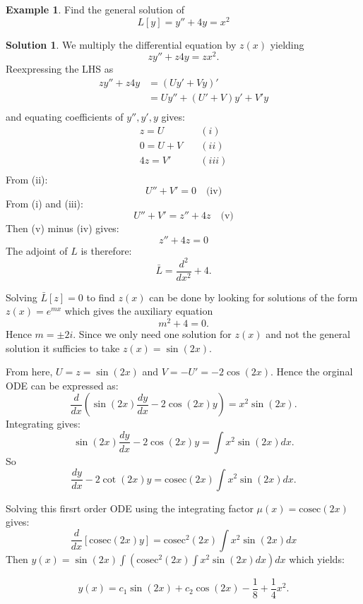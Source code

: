 \documentclass{article}
\theoremstyle{plain}
\theoremstyle{definition}
\newtheorem{exmp}{Example}[section]
\newtheorem*{sol}{Solution}
\numberwithin{equation}{section}
\begin{document}
\begin{tcolorbox}
    \begin{exmp}
        Find the general solution of
        \[ L[y]= y'' + 4y = x^2 \]
    \end{exmp}
    \begin{sol}
        We multiply the differential equation by $z(x)$ yielding
        \[ zy'' + z4y = zx^2. \]
        Reexpressing the LHS as
        \begin{align*}
            zy'' + z4y &= (Uy' + Vy)' \\
            &= Uy'' + (U'+V)y' + V'y \\
        \end{align*}
        and equating coefficients of $y'',y',y$ gives:
        \[ \begin{matrix}
            z=U & \quad (i) \\
            0 = U + V & \quad (ii) \\
            4z = V' & \quad (iii) \\
        \end{matrix}
        \]
        From (ii): 
        \[U''+V'=0 \quad \text{(iv)} \]
        From (i) and (iii):
        \[ U''+V' = z'' + 4z \quad \text{(v)} \]
        Then (v) minus (iv) gives:
        \[ z'' + 4z = 0 \]
        The adjoint of $L$ is therefore:
        \[ \bar{L} = \frac{d^2}{dx^2} + 4. \]

        Solving $\bar{L}[z] = 0$ to find $z(x)$ can be done by looking for solutions of the form $z(x) = e^{mx}$ which gives the auxiliary equation
        \[ m^2 + 4 = 0. \]
        Hence $m = \pm 2i$. Since we only need one solution for $z(x)$ and not the general solution it sufficies to take $z(x)=\sin(2x)$.

        From here, $U=z=\sin(2x)$ and $V=-U'=-2\cos(2x)$. Hence the orginal ODE can be expressed as:
        \[ \frac{d}{dx}\left( \sin(2x)\frac{dy}{dx} -2\cos(2x)y \right) = x^2\sin(2x). \]
        Integrating gives:
        \[ \sin(2x)\frac{dy}{dx} - 2\cos(2x)y = \int x^2 \sin (2x) dx.\]
        So
        \[ \frac{dy}{dx} - 2\cot(2x)y = \text{cosec}(2x) \int x^2 \sin(2x)dx.\]
        
        Solving this firsrt order ODE using the integrating factor $\mu(x) = \text{cosec}(2x)$ gives:
        \[ \frac{d}{dx} \left[ \text{cosec}(2x)y \right] = \text{cosec}^2(2x) \int x^2 \sin(2x) dx \]
        Then $y(x) = \sin(2x) \int \left( \text{cosec}^2(2x)\int x^2 \sin(2x) dx \right) dx$ which yields:

        \[ y(x) = c_1 \sin(2x) + c_2 \cos(2x) - \frac{1}{8} + \frac{1}{4}x^2. \]
    \end{sol}
\end{tcolorbox}
\end{document}
